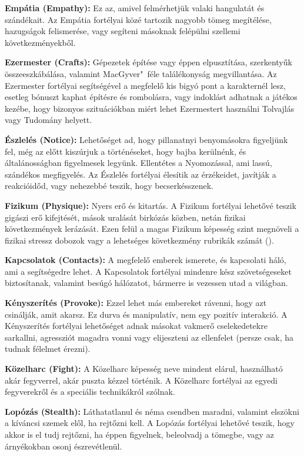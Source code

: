 \textbf{Empátia (Empathy):} Ez az, amivel felmérhetjük valaki hangulatát és szándékait. Az Empátia fortélyai közé tartozik nagyobb tömeg megítélése, hazugságok felismerése, vagy segíteni másoknak felépülni szellemi következményekből.

\textbf{Ezermester (Crafts):} Gépezetek építése vagy éppen elpusztítása, szerkentyűk összeeszkábálása, valamint MacGyver"~féle találékonyság megvillantása. Az Ezermester fortélyai segítségével a megfelelő kis bigyó pont a karakternél lesz, esetleg bónuszt kaphat építésre és rombolásra, vagy indoklást adhatnak a játékos kezébe, hogy bizonyos szituációkban miért lehet Ezermestert használni Tolvajlás vagy Tudomány helyett.

\textbf{Észlelés (Notice):} Lehetőséget ad, hogy pillanatnyi benyomásokra figyeljünk fel, még az előtt kiszúrjuk a történéseket, hogy bajba kerülnénk, és általánosságban figyelmesek legyünk. Ellentétes a Nyomozással, ami lassú, szándékos megfigyelés. Az Észlelés fortélyai élesítik az érzékeidet, javítják a reakcióidőd, vagy nehezebbé teszik, hogy becserkésszenek.

\textbf{Fizikum (Physique):} Nyers erő és kitartás. A Fizikum fortélyai lehetővé teszik gigászi erő kifejtését, mások uralását birkózás közben, netán fizikai következmények lerázását. Ezen felül a magas Fizikum képesség szint megnöveli a fizikai stressz dobozok vagy a lehetséges következmény rubrikák számát ().

\newpage

\textbf{Kapcsolatok (Contacts):} A megfelelő emberek ismerete, és kapcsolati háló, ami a segítségedre lehet. A Kapcsolatok fortélyai mindenre kész szövetségeseket biztosítanak, valamint besúgó hálózatot, bármerre is vezessen utad a világban.

\textbf{Kényszerítés (Provoke):} Ezzel lehet más embereket rávenni, hogy azt csinálják, amit akarsz. Ez durva és manipulatív, nem egy pozitív interakció. A Kényszerítés fortélyai lehetőséget adnak másokat vakmerő cselekedetekre sarkallni, agressziót magadra vonni vagy elijeszteni az ellenfelet (persze csak, ha tudnak félelmet érezni).

\textbf{Közelharc (Fight):} A Közelharc képesség neve mindent elárul, használható akár fegyverrel, akár puszta  kézzel történik. A Közelharc fortélyai az egyedi fegyverekről és a speciális technikákról szólnak.

\textbf{Lopózás (Stealth):} Láthatatlanul és néma csendben maradni, valamint elszökni a kíváncsi szemek elől, ha rejtőzni kell. A Lopózás fortélyai lehetővé teszik, hogy akkor is el tudj rejtőzni, ha éppen figyelnek, beleolvadj a tömegbe, vagy az árnyékokban osonj észrevétlenül.

